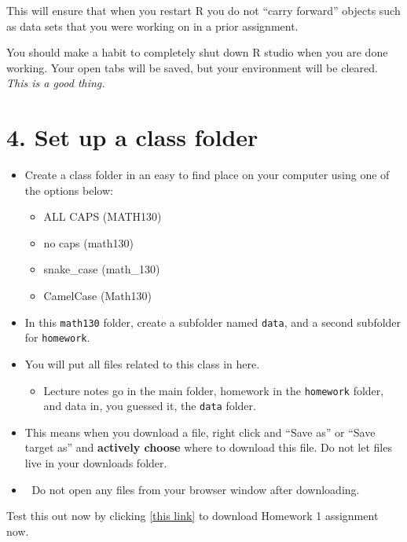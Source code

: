\documentclass[]{article}
\providecommand{\tightlist}{%
  \setlength{\itemsep}{0pt}\setlength{\parskip}{0pt}}
\begin{document}
This will ensure that when you restart R you do not ``carry forward''
objects such as data sets that you were working on in a prior
assignment.

You should make a habit to completely shut down R studio when you are
done working. Your open tabs will be saved, but your environment will be
cleared. \emph{This is a good thing.}

\hypertarget{set-up-a-class-folder}{%
\section{4. Set up a class folder}\label{set-up-a-class-folder}}

\begin{itemize}
\item
  Create a class folder in an easy to find place on your computer using
  one of the options below:

  \begin{itemize}
  \tightlist
  \item
    ALL CAPS (MATH130)
  \item
    no caps (math130)
  \item
    snake\_case (math\_130)
  \item
    CamelCase (Math130)
  \end{itemize}
\item
  In this \texttt{math130} folder, create a subfolder named
  \texttt{data}, and a second subfolder for \texttt{homework}.
\item
  You will put all files related to this class in here.

  \begin{itemize}
  \tightlist
  \item
    Lecture notes go in the main folder, homework in the
    \texttt{homework} folder, and data in, you guessed it, the
    \texttt{data} folder.
  \end{itemize}
\item
  This means when you download a file, right click and ``Save as'' or
  ``Save target as'' and \textbf{actively choose} where to download this
  file. Do not let files live in your downloads folder.
\item
  🚫 Do not open any files from your browser window after downloading.
\end{itemize}

Test this out now by clicking \href{hw/hw1.Rmd}{{[}this link{]}} to
download Homework 1 assignment now.
\end{document}
